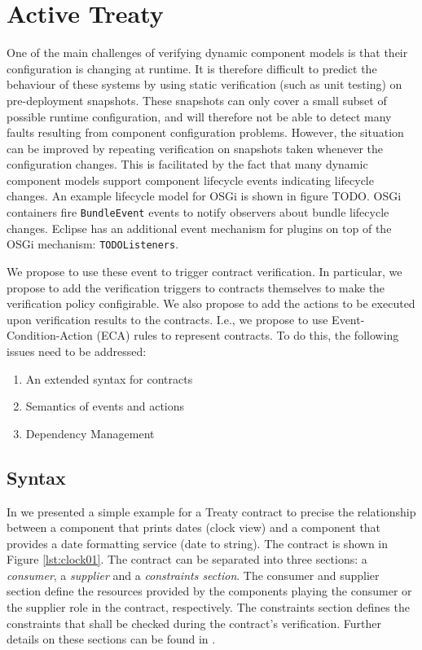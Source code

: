 \documentclass{llncs}
\begin{document}
\section{Active Treaty}

One of the main challenges of verifying dynamic component models is that their configuration is changing at runtime. It is therefore difficult to predict the behaviour of these systems by using static verification (such as unit testing) on pre-deployment snapshots. These snapshots can only cover a small subset of possible runtime configuration, and will therefore not be able to detect many faults resulting from component configuration problems. However, the situation can 
be improved by repeating verification on snapshots taken whenever the configuration changes. This is facilitated by the fact that many dynamic component models support component lifecycle  events indicating lifecycle changes. 
An example lifecycle model for OSGi is shown in figure TODO. OSGi containers fire \texttt{BundleEvent} events to notify observers about bundle lifecycle changes. Eclipse has an additional event mechanism for plugins on top of the OSGi mechanism: \texttt{TODOListeners}.  

We propose to use these event to trigger contract verification. In particular, we propose to add the verification triggers to contracts themselves to make the verification policy configirable. We also propose to add the actions to be executed 
upon verification results to the contracts. I.e., we propose to use Event-Condition-Action (ECA) rules to represent contracts. To do this, the following issues need to be addressed:

\begin{enumerate}
\item An extended syntax for contracts
\item Semantics of events and actions
\item Dependency Management
\end{enumerate}


\subsection{Syntax}

In \cite{Treaty.JOT2009} we presented a simple example for a Treaty contract to precise the relationship between a component that prints
dates (clock view) and a component that provides a date formatting service (date to string). The contract is shown in Figure \ref{lst:clock01}. The contract can be separated into three sections: a \textit{consumer}, a \textit{supplier} and a \textit{constraints section}. The consumer and supplier section define the resources provided by the components playing the consumer or the supplier role in the contract, respectively. The constraints section defines the constraints that shall be checked during the contract's verification. Further details on these sections can be found in \cite{Treaty.JOT2009}.
\end{document}
